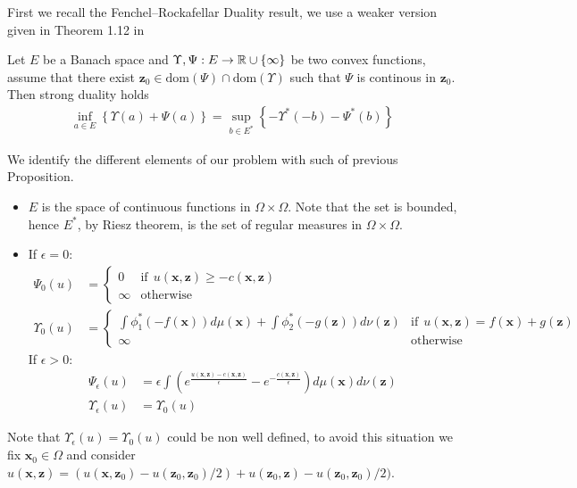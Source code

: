 First we recall the Fenchel–Rockafellar Duality result, we use a weaker version given in Theorem 1.12 in \cite{Brez}
\begin{Proposition} \label{Fenchel–Rockafellar}
Let $E$ be a Banach space and $\Upsilon,\Psi:E\rightarrow \mathbb{R} \cup \{\infty \}$ be two convex functions, assume that there exist ${{\textbf{z}}}_0\in\text{dom}(\Psi)\cap \text{dom}(\Upsilon) $ such that $\Psi$ is continous in ${{\textbf{z}}}_0$. Then strong duality holds
\begin{align} \label{FC}
\inf_{a\in E}\left\lbrace \Upsilon(a)+\Psi(a)\right\rbrace=\sup_{b\in E^*}\left\lbrace -\Upsilon^*(-b)-\Psi^*(b)\right\rbrace
\end{align}
\end{Proposition} 
We identify the different elements of our problem with such of previous Proposition. 
\begin{itemize}
\item $E$ is the space of continuous functions in $\Omega\times \Omega$. Note that the set is bounded, hence $E^*$, by Riesz theorem, is the set of regular measures in $\Omega\times \Omega$.
\item If $\epsilon=0:$
\begin{align}
\Psi_0(u)&=\begin{cases} 
      0 & \text{if} \ \ u(\textbf{x},{{\textbf{z}}})\geq -c(\textbf{x},{\textbf{z}})\\
      \infty & \text{otherwise }
   \end{cases}\\ 
\Upsilon_0(u)&= \begin{cases} 
      \int \phi_1^*(-f(\textbf{x}))d\mu(\textbf{x})+\int \phi_2^*(-g({{\textbf{z}}})) d\nu({{\textbf{z}}})  & \text{if} \ \ u(\textbf{x},{\textbf{z}})=f(\textbf{x})+g({\textbf{z}})\\ 
      \infty & \text{otherwise } 
   \end{cases}
\end{align}
If $\epsilon>0$:
\begin{align}
\Psi_{\epsilon}(u)&=\epsilon \int \left(e^{\frac{u(\textbf{x},{{\textbf{z}}})-c(\textbf{x},{\textbf{z}})}{\epsilon}}-e^{-\frac{c(\textbf{x},{\textbf{z}})}{\epsilon}}\right)d\mu(\textbf{x}) d\nu({{\textbf{z}}})\\ 
 \Upsilon_{\epsilon}(u)&=\Upsilon_0(u)
\end{align}
\end{itemize}
Note that $ \Upsilon_{\epsilon}(u)=\Upsilon_0(u)$ could be non well defined, to avoid this situation we fix $\textbf{x}_0\in \Omega$ and consider $u(\textbf{x},{{\textbf{z}}})=(u(\textbf{x},{{\textbf{z}}}_0)-u({{\textbf{z}}}_0,{{\textbf{z}}}_0)/2)+u({{\textbf{z}}}_0,{{\textbf{z}}})-u({{\textbf{z}}}_0,{{\textbf{z}}}_0)/2)$. 
